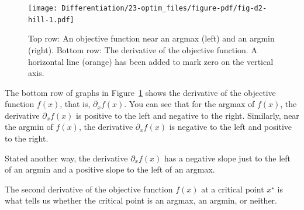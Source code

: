 \documentclass[
  letterpaper,
  DIV=11,
  numbers=noendperiod,
  oneside]{scrreprt}
\begin{document}
\begin{figure}

{\centering \texttt{[image: Differentiation/23-optim\_files/figure-pdf/fig-d2-hill-1.pdf]}

}

\caption{\label{fig-d2-hill}Top row: An objective function near an
argmax (left) and an argmin (right). Bottom row: The derivative of the
objective function. A horizontal line (orange) has been added to mark
zero on the vertical axis.}

\end{figure}

The bottom row of graphs in Figure~\ref{fig-d2-hill} shows the
derivative of the objective function \(f(x)\), that is,
\(\partial_x f(x)\). You can see that for the argmax of \(f(x)\), the
derivative \(\partial_x f(x)\) is positive to the left and negative to
the right. Similarly, near the argmin of \(f(x)\), the derivative
\(\partial_x f(x)\) is negative to the left and positive to the right.

Stated another way, the derivative \(\partial_x f(x)\) has a negative
slope just to the left of an argmin and a positive slope to the left of
an argmax.

The second derivative of the objective function \(f(x)\) at a critical
point \(x^\star\) is what tells us whether the critical point is an
argmax, an argmin, or neither.

\end{document}
